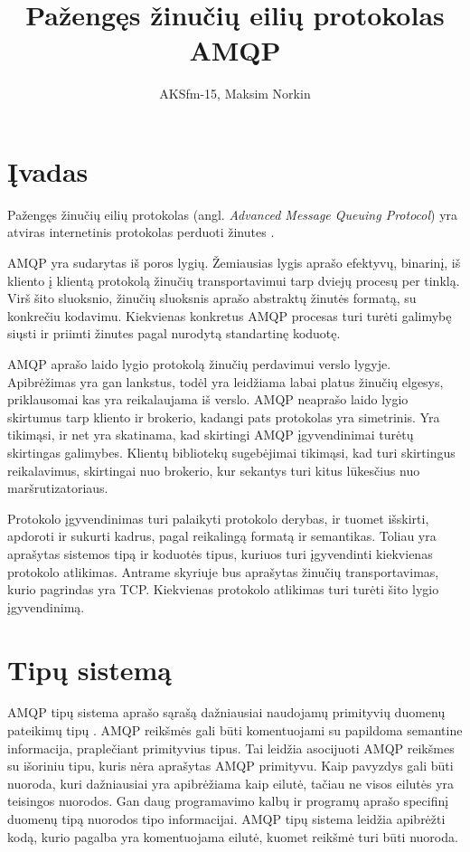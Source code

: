 \documentclass[12pt, a4paper, lithuanian]{article}
\author{AKSfm-15, Maksim Norkin}
\title{Pažengęs žinučių eilių protokolas\\AMQP}
\date{}
\begin{document}
    \maketitle

    \newpage

    \tableofcontents

    \newpage

    \section{Įvadas}

    Pažengęs žinučių eilių protokolas (angl. \textit{Advanced Message Queuing Protocol}) yra atviras internetinis protokolas perduoti žinutes \cite{OASISAdv29:online, vinoski2006advanced}.

    AMQP yra sudarytas iš poros lygių.
    Žemiausias lygis aprašo efektyvų, binarinį, iš kliento į klientą protokolą žinučių transportavimui tarp dviejų procesų per tinklą.
    Virš šito sluoksnio, žinučių sluoksnis aprašo abstraktų žinutės formatą, su konkrečiu kodavimu.
    Kiekvienas konkretus AMQP procesas turi turėti galimybę siųsti ir priimti žinutes pagal nurodytą standartinę koduotę.

    AMQP aprašo laido lygio protokolą žinučių perdavimui verslo lygyje.
    Apibrėžimas yra gan lankstus, todėl yra leidžiama labai platus žinučių elgesys, priklausomai kas yra reikalaujama iš verslo.
    AMQP neaprašo laido lygio skirtumus tarp kliento ir brokerio, kadangi pats protokolas yra simetrinis.
    Yra tikimąsi, ir net yra skatinama, kad skirtingi AMQP įgyvendinimai turėtų skirtingas galimybes.
    Klientų bibliotekų sugebėjimai tikimąsi, kad turi skirtingus reikalavimus, skirtingai nuo brokerio, kur sekantys turi kitus lūkesčius nuo maršrutizatoriaus.

    Protokolo įgyvendinimas turi palaikyti protokolo derybas, ir tuomet išskirti, apdoroti ir sukurti kadrus, pagal reikalingą formatą ir semantikas.
    Toliau yra aprašytas sistemos tipą ir koduotės tipus, kuriuos turi įgyvendinti kiekvienas protokolo atlikimas.
    Antrame skyriuje bus aprašytas žinučių transportavimas, kurio pagrindas yra TCP.
    Kiekvienas protokolo atlikimas turi turėti šito lygio įgyvendinimą.

    \section{Tipų sistemą}

    AMQP tipų sistema aprašo sąrašą dažniausiai naudojamų primityvių duomenų pateikimų tipų \cite{OASISAdv52:online}.
    AMQP reikšmės gali būti komentuojami su papildoma semantine informacija, praplečiant primityvius tipus.
    Tai leidžia asocijuoti AMQP reikšmes su išoriniu tipu, kuris nėra aprašytas AMQP primityvu.
    Kaip pavyzdys gali būti nuoroda, kuri dažniausiai yra apibrėžiama kaip eilutė, tačiau ne visos eilutės yra teisingos nuorodos.
    Gan daug programavimo kalbų ir programų aprašo specifinį duomenų tipą nuorodos tipo informacijai.
    AMQP tipų sistema leidžia apibrėžti kodą, kurio pagalba yra komentuojama eilutė, kuomet reikšmė turi būti nuoroda.
\end{document}
